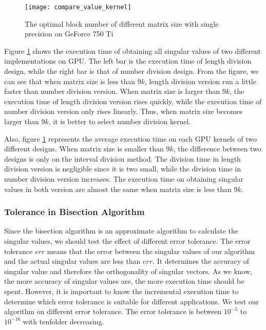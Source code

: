 \begin{figure}[hbpt]
\centering
\texttt{[image: compare\_value\_kernel]}
\caption{The optimal block number of different matrix size with single precision on GeForce 750 Ti}
\label{fig:compare_value_kernel}
\end{figure}
Figure \ref{fig:compare_value_kernel} shows the execution time of obtaining all singular values of two different implementations on GPU.
The left bar is the execution time of length division design, while the right bar is that of number division design.
From the figure, we can see that when matrix size is less than $9k$, length division version run a little faster than number division version.
When matrix size is larger than $9k$, the execution time of length division version rises quickly, while the execution time of number division version only rises linearly.
Thus, when matrix size becomes larger than $9k$, it is better to select number division kernel.

Also, figure \ref{fig:compare_value_kernel} represents the average execution time on each GPU kernels of two different designs.
When matrix size is smaller than $9k$, the difference between two designs is only on the interval division method.
The division time in length division version is negligible since it is two small, while the division time in number division version increases.
The execution time on obtaining singular values in both version are almost the same when matrix size is less than $9k$.

\subsubsection{Tolerance in Bisection Algorithm}
Since the bisection algorithm is an approximate algorithm to calculate the singular values, we should test the effect of different error tolerance.
The error tolerance $err$ means that the error between the singular values of our algorithm and the actual singular values are less than $err$.
It determines the accuracy of singular value and therefore the orthogonality of singular vectors.
As we know, the more accuracy of singular values are, the more execution time should be spent.
However, it is important to know the incremental execution time to determine which error tolerance is suitable for different applications.
We test our algorithm on different error tolerance.
The error tolerance is between $10^{-5}$ to $10^{-16}$ with tenfolder decreasing.

